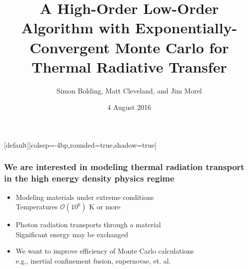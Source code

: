 \documentclass[xcolor=dvipsnames,hyperref={pdfpagelabels=false},unknownkeysallowed]{beamer}
\title[HOLO for TRT]{A High-Order Low-Order Algorithm with Exponentially-Convergent Monte Carlo for
    Thermal Radiative Transfer}
\author[S.R. Bolding]{{Simon Bolding, Matt Cleveland, and Jim Morel}}
\date{{4 August 2016} }
\newcommand{\colb}[1]{{\color{blue} #1}}
\newcommand{\colG}[1]{{\color{Gray!110} #1}}
\newlength{\wideitemsep}
\let\olditem\item
\renewcommand{\item}{\setlength{\itemsep}{\wideitemsep}\olditem}
\begin{document}
[default][colsep=-4bp,rounded=true,shadow=true]

\def\beginpage{\null\vfill\bgroup
\offinterlineskip\leftskip=\z@}
\def\endpage{\egroup\eject}

\begin{frame}
    \titlepage \vspace{-0.213in}
    \begin{center}
    \end{center}    
\end{frame}

\setlength{\tabcolsep}{6pt}



\begin{frame}
\frametitle{We are interested in modeling thermal radiation transport \\ in the high energy
    density physics regime}
{\addtolength{\leftmargini}{-0.2in}
    \addtolength{\wideitemsep}{0.08in}
\begin{itemize}
    \item[] Modeling materials under extreme conditions \\ \colG{Temperatures $\mathcal{O}(10^6)$ K or more}
    \item[] Photon radiation transports through a material \\ 
        \colG{Significant \colb{energy}  may be exchanged}
 \item[] We want to improve efficiency of Monte Carlo calculations \\
     \colG{e.g., inertial confinement fusion, supernovae, et. al.}
    \end{itemize}}
\end{frame}
\end{document}
